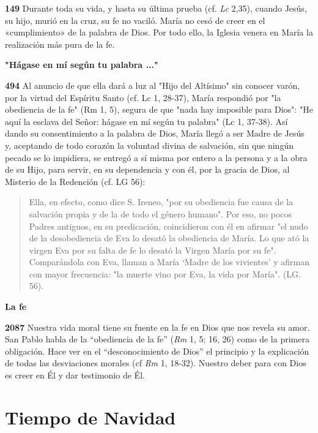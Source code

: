 \documentclass[]{article}
\begin{document}
\textbf{149} Durante toda su vida, y hasta su última prueba (cf.
\emph{Lc} 2,35), cuando Jesús, su hijo, murió en la cruz, su fe no
vaciló. María no cesó de creer en el «cumplimiento» de la palabra de
Dios. Por todo ello, la Iglesia venera en María la realización más pura
de la fe.

\textbf{"Hágase en mí según tu palabra ..."}

\textbf{494} Al anuncio de que ella dará a luz al "Hijo del Altísimo"
sin conocer varón, por la virtud del Espíritu Santo (cf. Lc 1, 28-37),
María respondió por "la obediencia de la fe" (Rm 1, 5), segura de que
"nada hay imposible para Dios": "He aquí la esclava del Señor: hágase en
mí según tu palabra" (Lc 1, 37-38). Así dando su consentimiento a la
palabra de Dios, María llegó a ser Madre de Jesús y, aceptando de todo
corazón la voluntad divina de salvación, sin que ningún pecado se lo
impidiera, se entregó a sí misma por entero a la persona y a la obra de
su Hijo, para servir, en su dependencia y con él, por la gracia de Dios,
al Misterio de la Redención (cf. LG 56):

\begin{quote}
Ella, en efecto, como dice S. Ireneo, "por su obediencia fue causa de la
salvación propia y de la de todo el género humano". Por eso, no pocos
Padres antiguos, en su predicación, coincidieron con él en afirmar "el
nudo de la desobediencia de Eva lo desató la obediencia de María. Lo que
ató la virgen Eva por su falta de fe lo desató la Virgen María por su
fe". Comparándola con Eva, llaman a María `Madre de los vivientes' y
afirman con mayor frecuencia: "la muerte vino por Eva, la vida por
María". (LG. 56).
\end{quote}

\textbf{La fe}

\textbf{2087} Nuestra vida moral tiene su fuente en la fe en Dios que
nos revela su amor. San Pablo habla de la ``obediencia de la fe''
(\emph{Rm} 1, 5; 16, 26) como de la primera obligación. Hace ver en el
``desconocimiento de Dios'' el principio y la explicación de todas las
desviaciones morales (cf \emph{Rm} 1, 18-32). Nuestro deber para con
Dios es creer en Él y dar testimonio de Él.

\section{}\label{section-1}

\section{Tiempo de Navidad}\label{tiempo-de-navidad}
\end{document}

